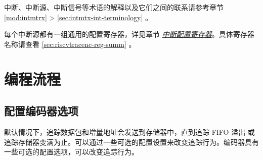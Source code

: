 \documentclass[main\_\_CN.tex]{subfiles}
\begin{document}
\begin{tiplisting}
中断、中断源、中断信号等术语的解释以及它们之间的联系请参考章节 \ref{mod:intmtrx} \textit{} > \ref{sec:intmtx-int-terminology} \textit{}。
\end{tiplisting}

每个中断源都有一组通用的配置寄存器，详见章节 \hyperref[interrupt-config-registers]{\textit{中断配置寄存器}}。具体寄存器名称请查看 \ref{sec:riscvtracenc-reg-summ} \textit{}。



\section{编程流程}
\label{sec:riscvtracenc-prog-procedures}

\subsection{配置编码器选项}

默认情况下，追踪数据包和增量地址会发送到存储器中，直到追踪 FIFO 溢出 或追踪存储器变满为止。可以通过一些可选的配置设置来改变追踪行为。编码器具有一些可选的配置选项，可以改变追踪行为。
\end{document}

